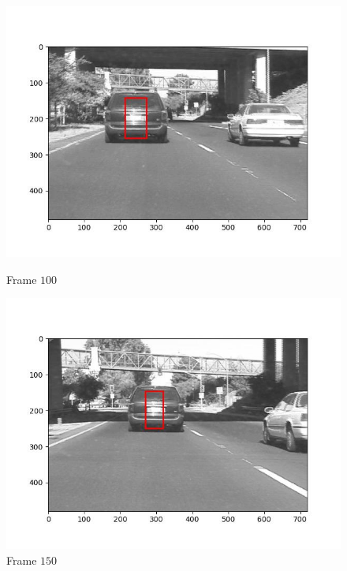 \begin{figure}[H]
\begin{minipage}{.49\textwidth}
    \includegraphics[width=\textwidth]{./figures/ic_affine/car1/frame000100.jpg}
    \caption{Frame $100$}
  \end{minipage}
  \begin{minipage}{.49\textwidth}
    \centering
    \includegraphics[width=\textwidth]{./figures/ic_affine/car1/frame000150.jpg}
    \caption{Frame $150$}
  \end{minipage}
  \hfill
  \begin{minipage}{.49\textwidth}
    \centering

\end{minipage}
\end{figure}
